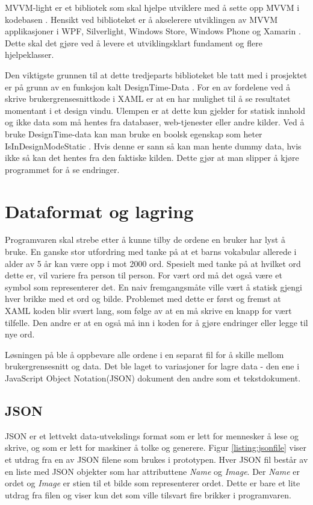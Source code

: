  MVVM-light er et bibliotek som skal hjelpe utviklere med å sette opp MVVM i kodebasen \cite{Nico0:online}. Hensikt ved biblioteket er å akselerere utviklingen av MVVM applikasjoner i WPF, Silverlight, Windows Store, Windows Phone og Xamarin \cite{MVVM8:online}. Dette skal det gjøre ved å levere et utviklingsklart fundament og flere hjelpeklasser. 


Den viktigste grunnen til at dette tredjeparts biblioteket ble tatt med i prosjektet er på grunn av en funksjon kalt DesignTime-Data \cite{MVVMLightDoc:online}. For en av fordelene ved å skrive brukergrensesnittkode i XAML er at en har mulighet til å se resultatet momentant i et design vindu. Ulempen er at dette kun gjelder for statisk innhold og ikke data som må hentes fra databaser, web-tjenester eller andre kilder. Ved å bruke DesignTime-data kan man bruke en boolsk egenskap som heter IsInDesignModeStatic \cite{MVVM100123:online}. Hvis denne er sann så kan man hente dummy data, hvis ikke så kan det hentes fra den faktiske kilden. Dette gjør at man slipper å kjøre programmet for å se endringer. 


\section{Dataformat og lagring}


Programvaren skal strebe etter å kunne tilby de ordene en bruker har lyst å bruke. En ganske stor utfordring med tanke på at et barns vokabular allerede i alder av 5 år kan være opp i mot 2000 ord. Spesielt med tanke på at hvilket ord dette er, vil variere fra person til person. For vært ord må det også være et symbol som representerer det. En naiv fremgangsmåte ville vært å statisk gjengi hver brikke med et ord og bilde. Problemet med dette er først og fremst at XAML koden blir svært lang, som følge av at en må skrive en knapp for vært tilfelle. Den andre er at en også må inn i koden for å gjøre endringer eller legge til nye ord. 

Løsningen på ble å oppbevare alle ordene i en separat fil for å skille mellom brukergrensesnitt og data. Det ble laget to variasjoner for lagre data - den ene i JavaScript Object Notation(JSON) dokument den andre som et tekstdokument.

\subsection{JSON}

JSON er et lettvekt data-utvekslings format som er lett for mennesker å lese og skrive, og som er lett for maskiner å tolke og generere\cite{JSON7:online}. Figur \ref{listing:jsonfile} viser et utdrag fra en av JSON filene som brukes i prototypen. Hver JSON fil består av en liste med JSON objekter som har attributtene \textit{Name} og \textit{Image}. Der \textit{Name} er ordet og \textit{Image} er stien til et bilde som representerer ordet. Dette er bare et lite utdrag fra filen og viser kun det som ville tilsvart fire brikker i programvaren.

